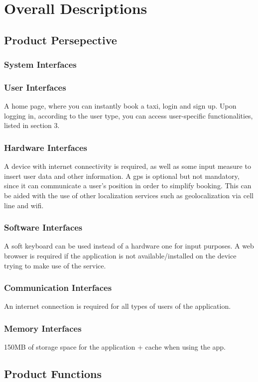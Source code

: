 \section{Overall Descriptions}

\subsection{Product Persepective}
	\subsubsection{System Interfaces}
		
	\subsubsection{User Interfaces}
		A home page, where you can instantly book a taxi, login and sign up. Upon logging in, according to the user type, 
		you can access user-specific functionalities, listed in section 3.
	\subsubsection{Hardware Interfaces}
		A device with internet connectivity is required, as well as some input measure to insert user data and other information. A gps is optional
		but not mandatory, since it can communicate a user's position in order to simplify booking. This can be aided with the use of other localization
		services such as geolocalization via cell line and wifi.
	\subsubsection{Software Interfaces}
		A soft keyboard can be used instead of a hardware one for input purposes. A web browser is required if the application is not available/installed
		on the device trying to make use of the service.
	\subsubsection{Communication Interfaces}
		An internet connection is required for all types of users of the application. 
	\subsubsection{Memory Interfaces}
		150MB of storage space for the application + cache when using the app.
	
\subsection{Product Functions}
